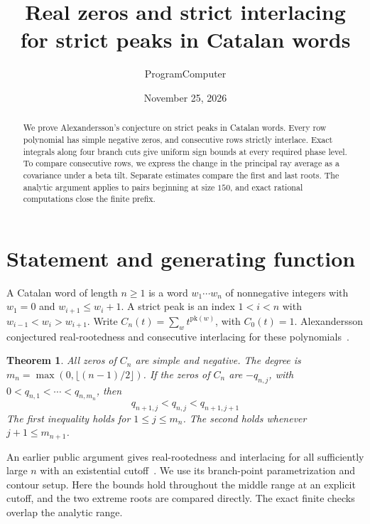 \documentclass[11pt]{article}
\title{Real zeros and strict interlacing\\ for strict peaks in Catalan words}
\author{ProgramComputer}
\date{November 25, 2026}
\newtheorem{theorem}{Theorem}
\begin{document}
\maketitle

\begin{abstract}
We prove Alexandersson's conjecture on strict peaks in Catalan words. Every row polynomial has simple negative zeros, and consecutive rows strictly interlace. Exact integrals along four branch cuts give uniform sign bounds at every required phase level. To compare consecutive rows, we express the change in the principal ray average as a covariance under a beta tilt. Separate estimates compare the first and last roots. The analytic argument applies to pairs beginning at size \(150\), and exact rational computations close the finite prefix.
\end{abstract}

\section{Statement and generating function}

A Catalan word of length \(n\ge1\) is a word \(w_1\cdots w_n\) of nonnegative integers with \(w_1=0\) and \(w_{i+1}\le w_i+1\). A strict peak is an index \(1<i<n\) with \(w_{i-1}<w_i>w_{i+1}\). Write \(C_n(t)=\sum_w t^{\mathrm{pk}(w)}\), with \(C_0(t)=1\). Alexandersson conjectured real-rootedness and consecutive interlacing for these polynomials~\cite{original}.

\begin{theorem}\label{thm:main}
All zeros of \(C_n\) are simple and negative. The degree is \(m_n=\max(0,\lfloor(n-1)/2\rfloor)\). If the zeros of \(C_n\) are \(-q_{n,j}\), with \(0<q_{n,1}<\cdots<q_{n,m_n}\), then
\[
q_{n+1,j}<q_{n,j}<q_{n+1,j+1}
\]
The first inequality holds for \(1\le j\le m_n\). The second holds whenever \(j+1\le m_{n+1}\).
\end{theorem}

An earlier public argument gives real-rootedness and interlacing for all sufficiently large \(n\) with an existential cutoff~\cite{eventual}. We use its branch-point parametrization and contour setup. Here the bounds hold throughout the middle range at an explicit cutoff, and the two extreme roots are compared directly. The exact finite checks overlap the analytic range.
\end{document}
